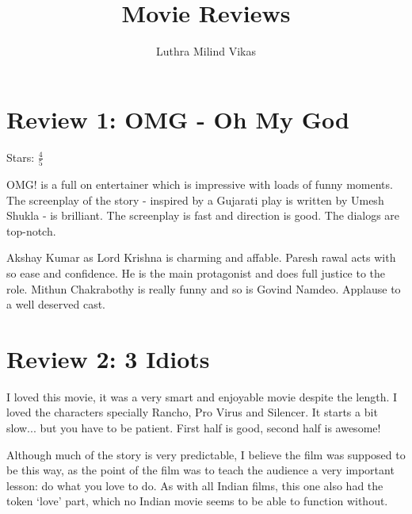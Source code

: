 \documentclass{article}
\author{Luthra Milind Vikas} %
\date{}
\title{Movie Reviews}
\begin{document}
\maketitle

\section{Review 1: OMG - Oh My God}

Stars: $\frac{4}{5}$


OMG! is a full on entertainer which is impressive with loads of funny moments. The screenplay of the story - inspired by a Gujarati play is written by Umesh Shukla - is brilliant. The screenplay is fast and direction is good. The dialogs are top-notch.

Akshay Kumar as Lord Krishna is charming and affable. Paresh rawal acts with so ease and confidence. He is the main protagonist and does full justice to the role. Mithun Chakrabothy is really funny and so is Govind Namdeo. Applause to a well deserved cast.


\section{Review 2: 3 Idiots}

I loved this movie, it was a very smart and enjoyable movie despite the length. I loved the characters specially Rancho, Pro Virus and Silencer. It starts a bit slow... but you have to be patient. First half is good, second half is awesome!

Although much of the story is very predictable, I believe the film was supposed to be this way, as the point of the film was to teach the audience a very important lesson: do what you love to do. As with all Indian films, this one also had the token `love' part, which no Indian movie seems to be able to function without.


\end{document}
